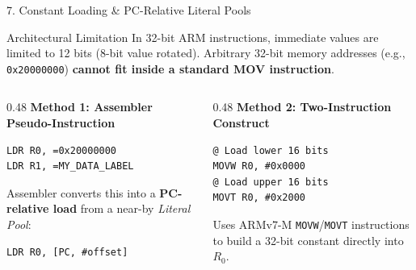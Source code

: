 \documentclass[aspectratio=169,10pt]{beamer}
\begin{document}
\begin{frame}[fragile]{7. Constant Loading \& PC-Relative Literal Pools}
  \begin{alertblock}{Architectural Limitation}
    In 32-bit ARM instructions, immediate values are limited to 12 bits (8-bit value rotated). Arbitrary 32-bit memory addresses (e.g., \texttt{0x20000000}) \textbf{cannot fit inside a standard MOV instruction}.
  \end{alertblock}

  \vspace{0.2cm}
  \begin{columns}[T]
    \begin{column}{0.48\textwidth}
      \textbf{Method 1: Assembler Pseudo-Instruction}
      \begin{lstlisting}
LDR R0, =0x20000000
LDR R1, =MY_DATA_LABEL
      \end{lstlisting}
      \small Assembler converts this into a \textbf{PC-relative load} from a near-by \textit{Literal Pool}:
      \begin{lstlisting}
LDR R0, [PC, #offset]
      \end{lstlisting}
    \end{column}

    \begin{column}{0.48\textwidth}
      \textbf{Method 2: Two-Instruction Construct}
      \begin{lstlisting}
@ Load lower 16 bits
MOVW R0, #0x0000
@ Load upper 16 bits
MOVT R0, #0x2000
      \end{lstlisting}
      \small Uses ARMv7-M \texttt{MOVW}/\texttt{MOVT} instructions to build a 32-bit constant directly into $R_0$.
    \end{column}
  \end{columns}
\end{frame}
\end{document}
